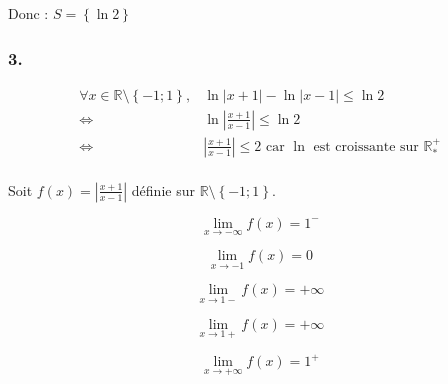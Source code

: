 \documentclass{report}
\begin{document}
Donc : $S=\left\lbrace \ln 2 \right\rbrace$

\subsubsection*{3.}
\begin{equation*}
	\begin{split}
		\forall x \in \mathbb{R} \setminus \left\lbrace -1 ; 1 \right\rbrace, & \ln |x+1| - \ln |x-1| \leq \ln 2 \\
		\Longleftrightarrow & \ln \left| \frac{x+1}{x-1} \right| \leq \ln 2 \\
		\Longleftrightarrow & \left| \frac{x+1}{x-1} \right| \leq 2 \text{ car $\ln$ est croissante sur $\mathbb{R}^{+}_{*}$} \\
	\end{split}
\end{equation*}


Soit $f(x) = \left| \frac{x+1}{x-1} \right|$ définie sur $\mathbb{R} \setminus \left\lbrace -1 ; 1 \right\rbrace$.

\begin{displaymath}
	\lim_{x \rightarrow -\infty} f(x) = 1^{-}
\end{displaymath}

\begin{displaymath}
	\lim_{x \rightarrow -1} f(x) = 0
\end{displaymath}

\begin{displaymath}
	\lim_{x \rightarrow 1-} f(x) = +\infty
\end{displaymath}

\begin{displaymath}
	\lim_{x \rightarrow 1+} f(x) = +\infty
\end{displaymath}

\begin{displaymath}
	\lim_{x \rightarrow +\infty} f(x) = 1^{+}
\end{displaymath}

\end{document}
